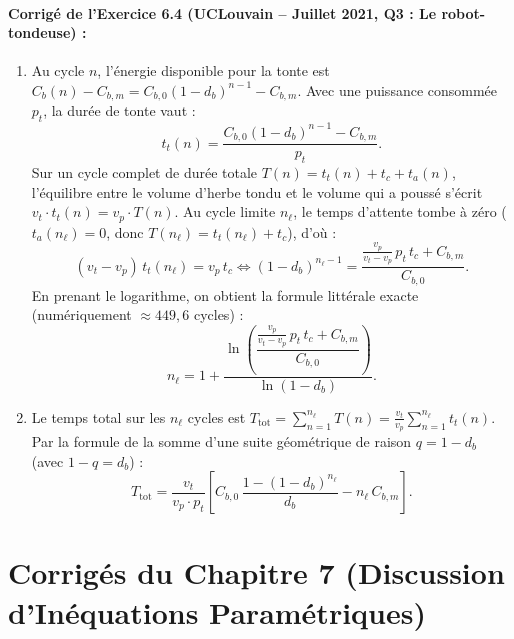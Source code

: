 \paragraph{Corrigé de l'Exercice 6.4 (UCLouvain -- Juillet 2021, Q3 : Le robot-tondeuse) :}
\begin{enumerate}[label=(\alph*)]
    \item Au cycle $n$, l'énergie disponible pour la tonte est $C_b(n) - C_{b,m} = C_{b,0}(1 - d_b)^{n-1} - C_{b,m}$. Avec une puissance consommée $p_t$, la durée de tonte vaut :
    \[
        \boxed{t_t(n) = \frac{C_{b,0}(1 - d_b)^{n-1} - C_{b,m}}{p_t}}.
    \]
    Sur un cycle complet de durée totale $T(n) = t_t(n) + t_c + t_a(n)$, l'équilibre entre le volume d'herbe tondu et le volume qui a poussé s'écrit $v_t \cdot t_t(n) = v_p \cdot T(n)$. Au cycle limite $n_\ell$, le temps d'attente tombe à zéro ($t_a(n_\ell) = 0$, donc $T(n_\ell) = t_t(n_\ell) + t_c$), d'où :
    \[
        (v_t - v_p)\,t_t(n_\ell) = v_p\,t_c \iff (1 - d_b)^{n_\ell - 1} = \frac{\frac{v_p}{v_t - v_p}\,p_t\,t_c + C_{b,m}}{C_{b,0}}.
    \]
    En prenant le logarithme, on obtient la formule littérale exacte (numériquement $\approx 449,6$ cycles) :
    \[
        \boxed{n_\ell = 1 + \frac{\ln\left(\dfrac{\frac{v_p}{v_t - v_p}\,p_t\,t_c + C_{b,m}}{C_{b,0}}\right)}{\ln(1 - d_b)}}.
    \]
    \item Le temps total sur les $n_\ell$ cycles est $T_{\text{tot}} = \sum_{n=1}^{n_\ell} T(n) = \frac{v_t}{v_p}\sum_{n=1}^{n_\ell} t_t(n)$. Par la formule de la somme d'une suite géométrique de raison $q = 1 - d_b$ (avec $1 - q = d_b$) :
    \[
        \boxed{T_{\text{tot}} = \frac{v_t}{v_p \cdot p_t}\left[C_{b,0}\,\frac{1 - (1 - d_b)^{n_\ell}}{d_b} - n_\ell\,C_{b,m}\right]}.
    \]
\end{enumerate}

\section{Corrigés du Chapitre 7 (Discussion d'Inéquations Paramétriques)}

